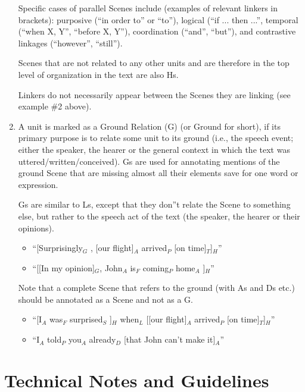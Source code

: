 \documentclass[11pt]{article}
\begin{document}
\begin{enumerate}
Specific cases of parallel Scenes include (examples of relevant linkers in brackets): purposive (``in order to'' or ``to''), logical (``if ... then ...'', temporal (``when X, Y'', ``before X, Y''), coordination (``and'', ``but''), and contrastive linkages (``however'', ``still'').

Scenes that are not related to any other units and are therefore in the top level of organization in the text are also Hs.

Linkers do not necessarily appear between the Scenes they are linking (see example \#2 above).

\item
A unit is marked as a Ground Relation (G) (or Ground for short), if its primary purpose is to relate some unit to its ground (i.e., the speech event; either the speaker, the hearer or the general context in which the text was uttered/written/conceived). Gs are used for annotating mentions of the ground Scene that are missing almost all their elements save for one word or expression.

Gs are similar to Ls, except that they don''t relate the Scene to something else, but rather to the speech act of the text (the speaker, the hearer or their opinions).

\begin{itemize}
\item
``[Surprisingly$_G$ , [our flight]$_A$ arrived$_P$ [on time]$_T$]$_H$''
\item
``[[In my opinion]$_G$, John$_A$ is$_F$ coming$_P$ home$_A$ ]$_H$''
\end{itemize}

Note that a complete Scene that refers to the ground (with As and Ds etc.) should be annotated as a Scene and not as a G.

\begin{itemize}
\item
``[I$_A$ was$_F$ surprised$_S$ ]$_H$ when$_L$ [[our flight]$_A$ arrived$_P$ [on time]$_T$]$_H$''
\item
``I$_A$ told$_P$ you$_A$ already$_D$ [that John can't make it]$_A$''
\end{itemize}

\end{enumerate}


\section{\large Technical Notes and Guidelines}
\end{document}
